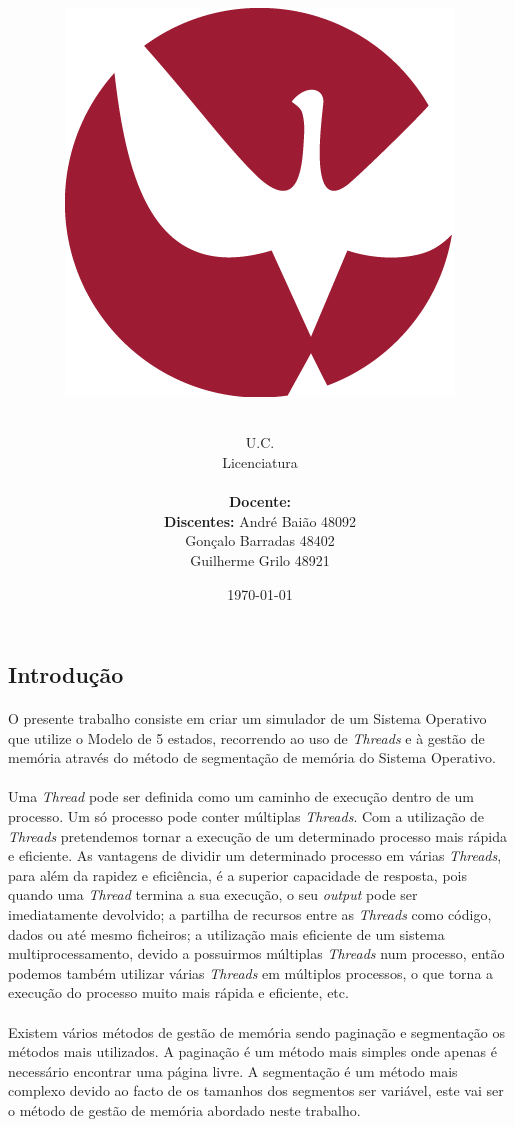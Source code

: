 \documentclass{article}
\title{ \includegraphics[scale=0.3]{imagens/uevora.png}\\
\vspace{1.0cm}
\paragraph{}
    U.C. \UC\\
Licenciatura \Licenciatura\\
\vspace{0.5cm}
\paragraph{}

\textbf{\work}}
\author{
\vspace{0.5 cm}
\textbf{Docente: }\docente\\
\hspace{1.95 cm} \textbf{Discentes: } André Baião 48092\\
\hspace{5.35 cm} Gonçalo Barradas 48402\\
\hspace{5.1 cm} Guilherme Grilo 48921
}
\date{\today}
\begin{document}
\maketitle
\thispagestyle{empty}
\newpage
\setcounter{page}{1}
\begin{center}
    \section*{Introdução}
\end{center}
\paragraph{}
O presente trabalho consiste em criar um simulador de um Sistema Operativo que utilize o Modelo de 5 estados, recorrendo ao uso de \textit{Threads} e à gestão de memória através do método de segmentação de memória do Sistema Operativo.

\paragraph{}
Uma \textit{Thread} pode ser definida como um caminho de execução dentro de um processo. Um só processo pode conter múltiplas \textit{Threads}. Com a utilização de \textit{Threads} pretendemos tornar a execução de um determinado processo mais rápida e eficiente. As vantagens de dividir um determinado processo em várias \textit{Threads}, para além da rapidez e eficiência, é a superior capacidade de resposta, pois quando uma \textit{Thread} termina a sua execução, o seu \textit{output} pode ser imediatamente devolvido; a partilha de recursos entre as \textit{Threads} como código, dados ou até mesmo ficheiros; a utilização mais eficiente de um sistema multiprocessamento, devido a possuirmos múltiplas \textit{Threads} num processo, então podemos também utilizar várias \textit{Threads} em múltiplos processos, o que torna a execução do processo muito mais rápida e eficiente, etc.

\paragraph{}
Existem vários métodos de gestão de memória sendo paginação e segmentação os métodos mais utilizados. A paginação é um método mais simples onde apenas é necessário encontrar uma página livre. A segmentação é um método mais complexo devido ao facto de os tamanhos dos segmentos ser variável, este vai ser o método de gestão de memória abordado neste trabalho. 
\end{document}
